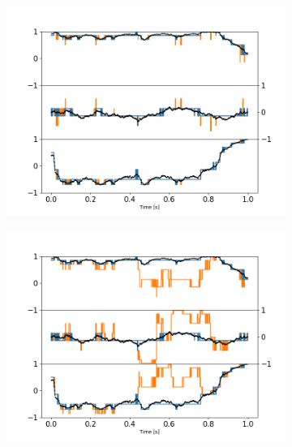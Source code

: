 \begin{figure}[h!]
	\centering
	\begin{subfigure}{0.31\textwidth}
		\subcaption{}
		\includegraphics[width =\textwidth]{fig9a.png}
	\end{subfigure}
	\begin{subfigure}{0.31\textwidth}
		\subcaption{}
		\includegraphics[width=\textwidth]{fig9b.png}
	\end{subfigure}
	\begin{subfigure}{0.31\textwidth}
		\subcaption{}

\end{subfigure}
\end{figure}
